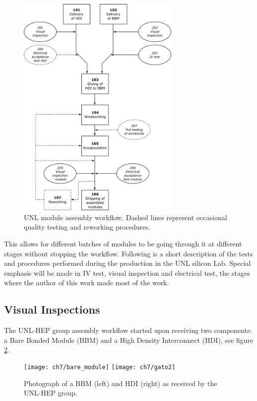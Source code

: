 \begin{figure}[!h]
  \centering
  \includegraphics[width=0.7\textwidth]{../images/ch7/unl_workflow}
  \caption[UNL module assembly workflow]{UNL module assembly workflow. Dashed lines represent occasional quality testing and reworking procedures\cite{ph1_sop}.}\label{fig:unlworkflow}
\end{figure}

This allows for different batches of modules to be going through it at different stages without stopping the workflow. Following is a short description of the tests and procedures performed during the production in the UNL silicon Lab. Special emphasis will be made in IV test, visual inspection and electrical test, the stages where the author of this work made most of the work{}. 

\subsection{Visual Inspections}
The UNL-HEP group assembly workflow started upon receiving two components: a Bare Bonded Module (BBM) and a High Density Interconnect (HDI), see figure \ref{fig:bbmyhdi}.

\begin{figure}[!h]
\centering
\texttt{[image: ch7/bare\_module]}
\texttt{[image: ch7/gato2]}
\caption[Photograph of a BBM and HDI.]{Photograph of a BBM (left) and HDI {}(right) as received by the UNL-HEP group.}\label{fig:bbmyhdi}
\end{figure}

